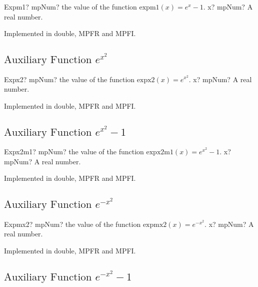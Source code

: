 \begin{mpFunctionsExtract}
	\mpFunctionOne
	{Expm1? mpNum? the value of the function $\text{expm1}(x) = e^{x}-1$.}
	{x? mpNum? A real number.}
\end{mpFunctionsExtract}

Implemented in double, MPFR and MPFI.




\subsection{\texorpdfstring{$\text{Auxiliary Function }e^{x^2}$}{expx2}}

\begin{mpFunctionsExtract}
	\mpFunctionOne
	{Expx2? mpNum? the value of the function $\text{expx2}(x) = e^{x^2}$.}
	{x? mpNum? A real number.}
\end{mpFunctionsExtract}

Implemented in double, MPFR and MPFI.


\subsection{\texorpdfstring{$\text{Auxiliary Function }e^{x^2}-1$}{expx2m1}}

\begin{mpFunctionsExtract}
	\mpFunctionOne
	{Expx2m1? mpNum? the value of the function $\text{expx2m1}(x) = e^{x^2}-1$.}
	{x? mpNum? A real number.}
\end{mpFunctionsExtract}


Implemented in double, MPFR and MPFI.



\subsection{\texorpdfstring{$\text{Auxiliary Function }e^{-x^2}$}{expmx2}}

\begin{mpFunctionsExtract}
	\mpFunctionOne
	{Expmx2? mpNum? the value of the function $\text{expmx2}(x) = e^{-x^2}$.}
	{x? mpNum? A real number.}
\end{mpFunctionsExtract}


Implemented in double, MPFR and MPFI.



\subsection{\texorpdfstring{$\text{Auxiliary Function }e^{-x^2}-1$}{expmx2m1}}

